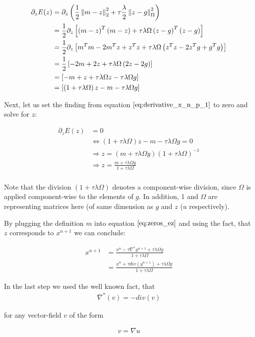 \begin{align}
	\partial_{z} E(z)
	&= \partial_{z} \left( \frac{1}{2} \left\lVert m - z\right\rVert_2^2 + \tau \frac{\lambda}{2}\left\lVert z - g\right\rVert_{\Omega}^2 \right) \nonumber \\
	&= \frac{1}{2} \partial_{z} \left[ \left( m - z \right)^{T}\left( m - z \right) + \tau \lambda \Omega \left( z -g \right)^{T}\left( z -g \right) \right] \nonumber \\
	&= \frac{1}{2} \partial_{z} \left[ m^{T}m -2m^{T} z + z^{T} z + \tau \lambda \Omega \left( z^{T}z -2z^{T} g + g^{T} g\right) \right] \nonumber \\
	&= \frac{1}{2} \left[ -2m + 2z + \tau \lambda \Omega \left( 2 z -2g \right) \right] \nonumber \\
	&= \left[ -m + z + \tau \lambda \Omega z - \tau \lambda \Omega g \right]	 \nonumber \\	
	&= \left[ \left(1+\tau \lambda \Omega \right)z-m - \tau \lambda \Omega g \right]	 \nonumber \\
\label{eq:derivative_x_n_p_1}		
\end{align}

Next, let us set the finding from equation $\ref{eq:derivative_x_n_p_1}$ to zero and solve for $z$:

\begin{align}
	\partial_{z} E(z) 
	&= 0 \nonumber \\
	&\Leftrightarrow \left(1+\tau \lambda \Omega \right)z-m - \tau \lambda \Omega g = 0 \nonumber \\
	&\Rightarrow z = \left(m +  \tau \lambda \Omega g \right) \left( 1+\tau \lambda \Omega\right)^{-1} \nonumber \\
	&\Rightarrow z = \frac{m +  \tau \lambda \Omega g}{1+\tau \lambda \Omega} \nonumber \\
\label{eq:zeros_ez}	
\end{align}

Note that the division $(1+\tau \lambda \Omega)$ denotes a component-wise division, since $\Omega$ is applied component-wise to the elements of $g$. In addition, 1 and $\Omega$ are representing matrices here (of same dimension as $g$ and $z$ ($u$ respectively).

By plugging the definition $m$ into equation $\ref{eq:zeros_ez}$ and using the fact, that $z$ corresponds to $x^{n+1}$ we can conclude:

\begin{align}
	x^{n+1} 
	&= \frac{x^n - \tau \nabla^* y^{n+1} +  \tau \lambda \Omega g}{1+\tau \lambda \Omega} \nonumber \\
	&= \frac{x^n + \tau div(y^{n+1}) +  \tau \lambda \Omega g}{1+\tau \lambda \Omega}
\label{eq:update_x_n_p_1}	
\end{align}

In the last step we used the well known fact, that 
\begin{align}
	\nabla^* (v) = -div(v)
\end{align}

for any vector-field $v$ of the form 

\begin{align}
	v = \nabla u
\end{align}
 
